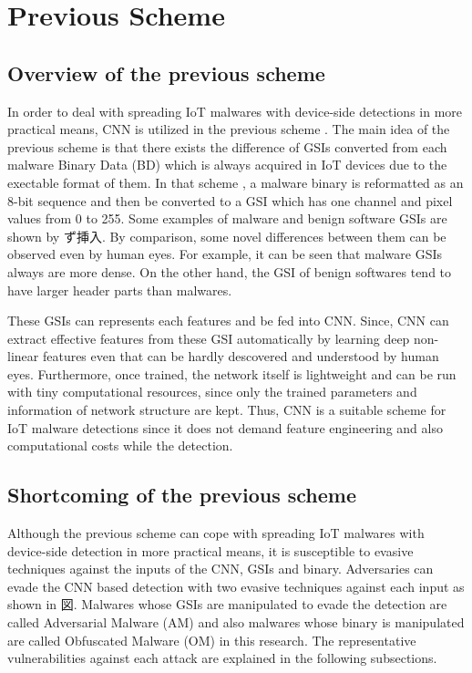 \chapter{Previous Scheme}\label{sec:previous_scheme}
\section{Overview of the previous scheme} 
In order to deal with spreading IoT malwares with device-side detections in more practical means, CNN is utilized in the previous scheme \cite{previous}.
The main idea of the previous scheme is that there exists the difference of GSIs converted from each malware Binary Data (BD) which is always acquired in IoT devices due to the exectable format of them.
In that scheme \cite{previous}, a malware binary is reformatted as an 8-bit sequence and then be converted to a GSI which has one channel and pixel values from 0 to 255.
Some examples of malware and benign software GSIs are shown by ず挿入.
By comparison, some novel differences between them can be observed even by human eyes.
For example, it can be seen that malware GSIs always are more dense.
On the other hand, the GSI of benign softwares tend to have larger header parts than malwares.

These GSIs can represents each features and be fed into CNN.
Since, CNN can extract effective features from these GSI automatically by learning deep non-linear features even that can be hardly descovered and understood by human eyes.
Furthermore, once trained, the network itself is lightweight and can be run with tiny computational resources, since only the trained parameters and information of network structure are kept.
Thus, CNN is a suitable scheme for IoT malware detections since it does not demand feature engineering and also computational costs while the detection.

\section{Shortcoming of the previous scheme } 
Although the previous scheme can cope with spreading IoT malwares with device-side detection in more practical means, it is susceptible to evasive techniques against the inputs of the CNN, GSIs and binary.
Adversaries can evade the CNN based detection with two evasive techniques against each input as shown in 図.
Malwares whose GSIs are manipulated to evade the detection are called Adversarial Malware (AM) and also malwares whose binary is manipulated are called Obfuscated Malware (OM) in this research.  
The representative vulnerabilities against each attack are explained in the following subsections.


